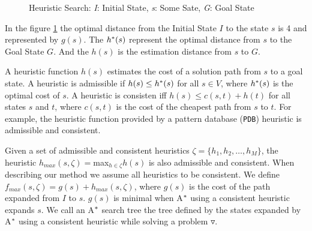 \begin{figure}[htb]
\centering
{}
\caption{Heuristic Search: \textit{I}: Initial State, \textit{s}: Some Sate, \textit{G}: Goal State} \label{fig:searchSpace}
\end{figure}

In the figure \ref{fig:searchSpace} the optimal distance from the Initial State $I$ to  the state $s$ is 4 and represented by $g(s)$. The $h\sp{*}(s)$ represent the optimal distance from $s$ to the Goal State $G$. And the $h(s)$ is the estimation distance from $s$ to $G$.

A heuristic function $h(s)$ estimates the cost of a solution path from $s$ to a goal state. A heuristic is admissible if $h(s) \leq h\sp{*}(s)$ for all $s \in V$, where $h\sp{*}(s)$ is the optimal cost of $s$. A heuristic is consisten iff $h(s) \leq c(s,t) + h(t)$ for all states $s$ and $t$, where $c(s,t)$ is the cost of the cheapest path from $s$ to $t$. For example, the heuristic function provided by a pattern database (\texttt{PDB}) heuristic \cite{culberson1998pattern} is admissible and consistent.

Given a set of admissible and consistent heuristics $\zeta = \{h_{1}, h_{2}, \dots, h_{M}\}$, the heuristic $h_{max}(s,\zeta) = $max$_{h \in \zeta} h(s)$ is also admissible and consistent. When describing our method we assume all heuristics to be consistent. We define $f_{max}(s, \zeta) = g(s) + h_{max}(s, \zeta)$, where $g(s)$ is the cost of the path expanded from $I$ to $s$. $g(s)$ is minimal when A$\sp{*}$ using a consistent heuristic expands $s$. We call an A$\sp{*}$ search tree the tree defined by the states expanded by A$\sp{*}$ using a consistent heuristic while solving a problem $\triangledown$.

